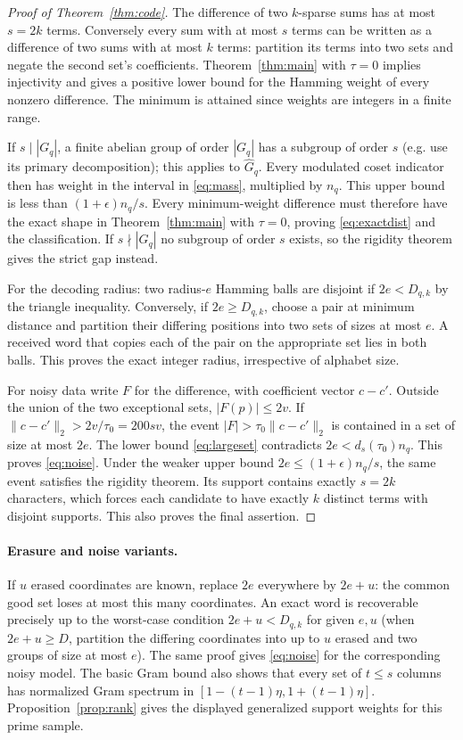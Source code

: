\documentclass[11pt]{article}
\theoremstyle{definition}\newtheorem{remark}[theorem]{Remark}
\newcommand{\norm}[1]{\lVert #1\rVert}
\begin{document}
\begin{proof}[Proof of Theorem~\ref{thm:code}]
The difference of two $k$-sparse sums has at most $s=2k$ terms. Conversely every sum with at most $s$ terms can be written as a difference of two sums with at most $k$ terms: partition its terms into two sets and negate the second set's coefficients. Theorem~\ref{thm:main} with $\tau=0$ implies injectivity and gives a positive lower bound for the Hamming weight of every nonzero difference. The minimum is attained since weights are integers in a finite range.

If $s\mid|G_q|$, a finite abelian group of order $|G_q|$ has a subgroup of order $s$ (e.g. use its primary decomposition); this applies to $\widehat G_q$. Every modulated coset indicator then has weight in the interval in \eqref{eq:mass}, multiplied by $n_q$. This upper bound is less than $(1+\epsilon)n_q/s$. Every minimum-weight difference must therefore have the exact shape in Theorem~\ref{thm:main} with $\tau=0$, proving \eqref{eq:exactdist} and the classification. If $s\nmid|G_q|$ no subgroup of order $s$ exists, so the rigidity theorem gives the strict gap instead.

For the decoding radius: two radius-$e$ Hamming balls are disjoint if $2e<D_{q,k}$ by the triangle inequality. Conversely, if $2e\ge D_{q,k}$, choose a pair at minimum distance and partition their differing positions into two sets of sizes at most $e$. A received word that copies each of the pair on the appropriate set lies in both balls. This proves the exact integer radius, irrespective of alphabet size.

For noisy data write $F$ for the difference, with coefficient vector $c-c'$. Outside the union of the two exceptional sets, $|F(p)|\le2v$. If $\norm{c-c'}_2>2v/\tau_0=200s v$, the event $|F|>\tau_0\norm{c-c'}_2$ is contained in a set of size at most $2e$. The lower bound \eqref{eq:largeset} contradicts $2e<d_s(\tau_0)n_q$. This proves \eqref{eq:noise}. Under the weaker upper bound $2e\le (1+\epsilon)n_q/s$, the same event satisfies the rigidity theorem. Its support contains exactly $s=2k$ characters, which forces each candidate to have exactly $k$ distinct terms with disjoint supports. This also proves the final assertion.
\end{proof}

\paragraph{Erasure and noise variants.} If $u$ erased coordinates are known, replace $2e$ everywhere by $2e+u$: the common good set loses at most this many coordinates. An exact word is recoverable precisely up to the worst-case condition $2e+u<D_{q,k}$ for given $e,u$ (when $2e+u\ge D$, partition the differing coordinates into up to $u$ erased and two groups of size at most $e$). The same proof gives \eqref{eq:noise} for the corresponding noisy model. The basic Gram bound also shows that every set of $t\le s$ columns has normalized Gram spectrum in $[1-(t-1)\eta,1+(t-1)\eta]$. Proposition~\ref{prop:rank} gives the displayed generalized support weights for this prime sample.
\end{document}
